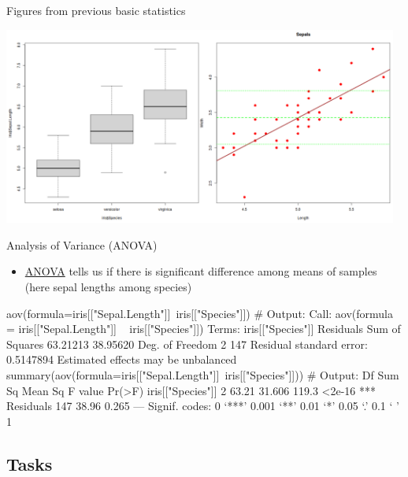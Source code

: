 \documentclass[compress, xelatex, 11pt, xcolor=svgnames, aspectratio=169,
	hyperref={
		bookmarks=true,
		unicode=true,
		colorlinks=true,
		pdftitle={Molecular data in R},
		plainpages=false,
		pdfauthor={Vojtech Zeisek},
		pdfsubject={Course about phylogeny and evolution in R},
		pdfcreator={XeLaTeX},
		pdfkeywords={R, evolution, phylogeny, molecular data},
		linkcolor=Crimson, %
		anchorcolor=Magenta, %
		citecolor=Magenta, %
		filecolor=Magenta, %
		menucolor=Magenta, %
		urlcolor=DodgerBlue, %
		},
	url={hyphens, lowtilde} %
	]{beamer}
\begin{document}
\begin{frame}{Figures from previous basic statistics}
	\begin{center}
		\includegraphics[height=6.5cm]{iris.png}
	\end{center}
\end{frame}

\begin{frame}[fragile]{Analysis of Variance (ANOVA)}
	\begin{itemize}
		\item \href{https://en.wikipedia.org/wiki/Analysis_of_variance}{ANOVA} tells us if there is significant difference among means of samples (here sepal lengths among species)
	\end{itemize}
	\begin{spluscode}
    aov(formula=iris[["Sepal.Length"]]~iris[["Species"]]) # Output:
    Call:
       aov(formula = iris[["Sepal.Length"]] ~ iris[["Species"]])
    Terms:
                    iris[["Species"]] Residuals
    Sum of Squares           63.21213  38.95620
    Deg. of Freedom                 2       147
    Residual standard error: 0.5147894
    Estimated effects may be unbalanced
    summary(aov(formula=iris[["Sepal.Length"]]~iris[["Species"]])) # Output:
                       Df Sum Sq Mean Sq F value Pr(>F)    
    iris[["Species"]]   2  63.21  31.606   119.3 <2e-16 ***
    Residuals         147  38.96   0.265                   
    ---
    Signif. codes:  0 ‘***’ 0.001 ‘**’ 0.01 ‘*’ 0.05 ‘.’ 0.1 ‘ ’ 1
	\end{spluscode}
\end{frame}

\subsection{Tasks}
\end{document}
